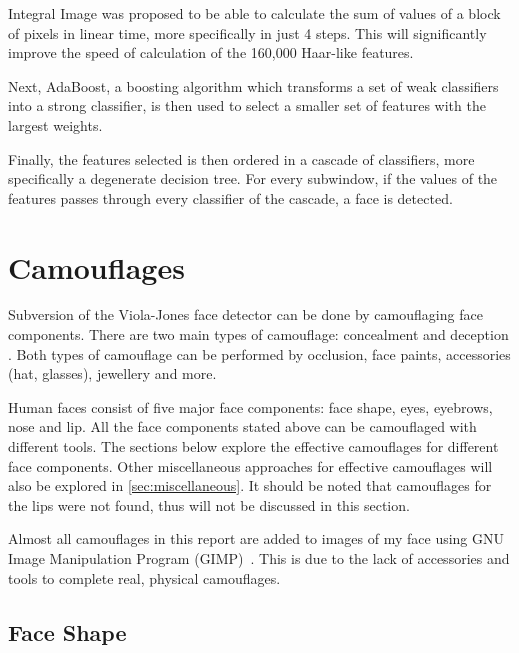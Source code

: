 \documentclass[10pt,twocolumn,letterpaper]{article}
\begin{document}
Integral Image was proposed to be able to calculate the sum of values of a block of pixels in linear time, more specifically in just 4 steps. This will significantly improve the speed of calculation of the 160,000 Haar-like features.

Next, AdaBoost, a boosting algorithm which transforms a set of weak classifiers into a strong classifier, is then used to select a smaller set of features with the largest weights.

Finally, the features selected is then ordered in a cascade of classifiers, more specifically a degenerate decision tree. For every subwindow, if the values of the features passes through every classifier of the cascade, a face is detected.


\section{Camouflages}


Subversion of the Viola-Jones face detector can be done by camouflaging face components. There are two main types of camouflage: concealment and deception \cite{facilitating-fashion-camouflage-art}. Both types of camouflage can be performed by occlusion, face paints, accessories (hat, glasses), jewellery and more.

Human faces consist of five major face components: face shape, eyes, eyebrows, nose and lip. All the face components stated above can be camouflaged with different tools. The sections below explore the effective camouflages for different face components. Other miscellaneous approaches for effective camouflages will also be explored in \cref{sec:miscellaneous}. It should be noted that camouflages for the lips were not found, thus will not be discussed in this section.

Almost all camouflages in this report are added to images of my face using GNU Image Manipulation Program (GIMP)~\cite{gimp}. This is due to the lack of accessories and tools to complete real, physical camouflages.


\subsection{Face Shape} \label{sec:face-shape}
\end{document}
